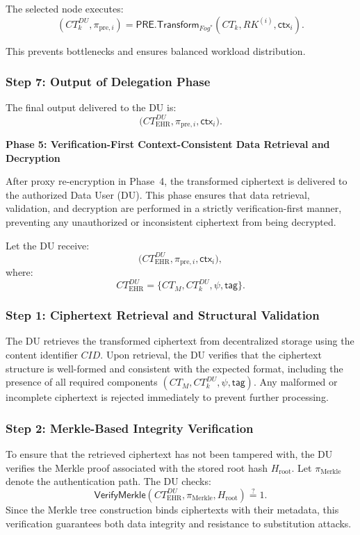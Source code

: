 \documentclass[conference]{IEEEtran}
\begin{document}
The selected node executes:
\[
(CT_k^{DU}, \pi_{\text{pre},i}) = \textsf{PRE.Transform}_{Fog^*}(CT_k, RK^{(i)}, \mathsf{ctx}_i).
\]

This prevents bottlenecks and ensures balanced workload distribution.

\subsubsection*{Step 7: Output of Delegation Phase}

The final output delivered to the DU is:
\[
\bigl(CT_{\text{EHR}}^{DU}, \pi_{\text{pre},i}, \mathsf{ctx}_i\bigr).
\]

\textbf{Phase 5: Verification-First Context-Consistent Data Retrieval and Decryption}
\label{sec:phase5}

After proxy re-encryption in Phase~4, the transformed ciphertext is delivered to the authorized Data User (DU). This phase ensures that data retrieval, validation, and decryption are performed in a strictly verification-first manner, preventing any unauthorized or inconsistent ciphertext from being decrypted.

Let the DU receive:
\[
\bigl(CT_{\text{EHR}}^{DU}, \pi_{\text{pre},i}, \mathsf{ctx}_i\bigr),
\]
where:
\[
CT_{\text{EHR}}^{DU} = \{CT_M, CT_k^{DU}, \psi, \mathsf{tag}\}.
\]

\subsubsection*{Step 1: Ciphertext Retrieval and Structural Validation}

The DU retrieves the transformed ciphertext from decentralized storage using the content identifier $CID$. Upon retrieval, the DU verifies that the ciphertext structure is well-formed and consistent with the expected format, including the presence of all required components $(CT_M, CT_k^{DU}, \psi, \mathsf{tag})$. Any malformed or incomplete ciphertext is rejected immediately to prevent further processing.

\subsubsection*{Step 2: Merkle-Based Integrity Verification}

To ensure that the retrieved ciphertext has not been tampered with, the DU verifies the Merkle proof associated with the stored root hash $H_{\text{root}}$. Let $\pi_{\text{Merkle}}$ denote the authentication path. The DU checks:
\[
\textsf{VerifyMerkle}(CT_{\text{EHR}}^{DU}, \pi_{\text{Merkle}}, H_{\text{root}}) \stackrel{?}{=} 1.
\]
Since the Merkle tree construction binds ciphertexts with their metadata, this verification guarantees both data integrity and resistance to substitution attacks.
\end{document}

